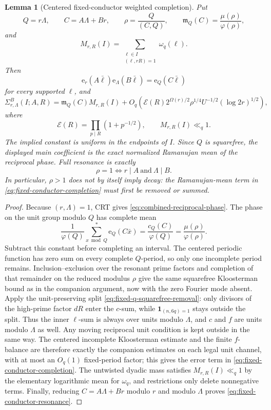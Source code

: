 \documentclass[11pt]{article}
\newtheorem{lemma}[theorem]{Lemma}
\theoremstyle{definition}
\theoremstyle{remark}
\newcommand{\1}{\mathbf 1}
\newcommand{\e}{\mathrm e}
\newcommand{\ph}{\varphi}
\newcommand{\Om}{\Omega}
\begin{document}
\begin{lemma}[Centered fixed-conductor weighted completion]\label{lem:fixed-conductor-completion}
Put
\[
Q=r\Lambda,
\qquad C=A\Lambda+Br,
\qquad \rho=\frac{Q}{(C,Q)},
\qquad
\mathfrak m_Q(C)=\frac{\mu(\rho)}{\ph(\rho)},
\]
and
\[
M_{r,R}(I)=\sum_{\substack{\ell\in I\\(\ell,rR)=1}}\omega_q(\ell).
\]
Then
\begin{equation}\label{eq:combined-reciprocal-phase}
\e_r(A\bar\ell)\e_{\Lambda}(B\bar\ell)
=\e_Q(C\bar\ell)
\end{equation}
for every supported $\ell$, and
\begin{equation}\label{eq:fixed-conductor-completion}
\boxed{
\Sigma_{r,\Lambda}^{B}(I;A,R)
=\mathfrak m_Q(C)M_{r,R}(I)
+O_q\!\left(
\mathcal E(R)2^{\Om(r)/2}\rho^{1/4}U^{-1/2}(\log 2r)^{1/2}
\right),
}
\end{equation}
where
\[
\mathcal E(R)=\prod_{p\mid R}(1+p^{-1/2}),
\qquad M_{r,R}(I)\ll_q1.
\]
The implied constant is uniform in the endpoints of $I$.  Since $Q$ is
squarefree, the displayed main coefficient is the exact normalized Ramanujan
mean of the reciprocal phase.  Full resonance is exactly
\begin{equation}\label{eq:fixed-conductor-resonance}
\rho=1
\Longleftrightarrow
r\mid A\ \text{and}\ \Lambda\mid B.
\end{equation}
In particular, $\rho>1$ does not by itself imply decay: the Ramanujan-mean
term in \eqref{eq:fixed-conductor-completion} must first be removed or summed.
\end{lemma}

\begin{proof}
Because $(r,\Lambda)=1$, CRT gives
\eqref{eq:combined-reciprocal-phase}.  The phase on the unit group modulo $Q$
has complete mean
\[
\frac1{\ph(Q)}\sum_{x\bmod Q}^{*}\e_Q(C\bar x)
=\frac{c_Q(C)}{\ph(Q)}
=\frac{\mu(\rho)}{\ph(\rho)}.
\]
Subtract this constant before completing an interval.  The centered periodic
function has zero sum on every complete $Q$-period, so only one incomplete
period remains.  Inclusion--exclusion over the resonant prime factors and
completion of that remainder on the reduced modulus $\rho$ give the same
squarefree Kloosterman bound as in the companion argument, now with the zero
Fourier mode absent.  Apply the unit-preserving split
\eqref{eq:fixed-q-squarefree-removal}: only divisors of the high-prime factor
$dR$ enter the $c$-sum, while $\1_{(n,6q)=1}$ stays outside the split.  Thus the
inner $\ell$-sum is always over units modulo $\Lambda$, and $c$ and $f$ are
units modulo $\Lambda$ as well.  Any moving reciprocal unit condition is kept
outside in the same way.  The centered incomplete Kloosterman estimate and the
finite $f$-balance are therefore exactly the companion estimates on each legal
unit channel, with at most an $O_q(1)$ fixed-period factor; this gives the error
term in \eqref{eq:fixed-conductor-completion}.  The untwisted dyadic mass
satisfies $M_{r,R}(I)\ll_q1$ by the elementary logarithmic mean for $\omega_q$,
and restrictions only delete nonnegative terms.  Finally, reducing
$C=A\Lambda+Br$ modulo $r$ and modulo $\Lambda$ proves
\eqref{eq:fixed-conductor-resonance}.
\end{proof}
\end{document}
